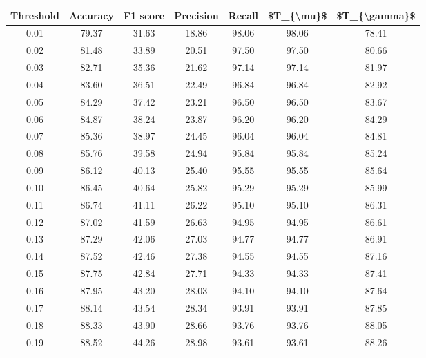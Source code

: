 \begin{tabular}{|c|c|c|c|c|c|c|}
\hline
 Threshold &  Accuracy &  F1 score &  Precision &  Recall &  \$T\_\{\textbackslash mu\}\$ &  \$T\_\{\textbackslash gamma\}\$ \\
\hline
      0.01 &     79.37 &     31.63 &      18.86 &   98.06 &      98.06 &         78.41 \\
      0.02 &     81.48 &     33.89 &      20.51 &   97.50 &      97.50 &         80.66 \\
      0.03 &     82.71 &     35.36 &      21.62 &   97.14 &      97.14 &         81.97 \\
      0.04 &     83.60 &     36.51 &      22.49 &   96.84 &      96.84 &         82.92 \\
      0.05 &     84.29 &     37.42 &      23.21 &   96.50 &      96.50 &         83.67 \\
      0.06 &     84.87 &     38.24 &      23.87 &   96.20 &      96.20 &         84.29 \\
      0.07 &     85.36 &     38.97 &      24.45 &   96.04 &      96.04 &         84.81 \\
      0.08 &     85.76 &     39.58 &      24.94 &   95.84 &      95.84 &         85.24 \\
      0.09 &     86.12 &     40.13 &      25.40 &   95.55 &      95.55 &         85.64 \\
      0.10 &     86.45 &     40.64 &      25.82 &   95.29 &      95.29 &         85.99 \\
      0.11 &     86.74 &     41.11 &      26.22 &   95.10 &      95.10 &         86.31 \\
      0.12 &     87.02 &     41.59 &      26.63 &   94.95 &      94.95 &         86.61 \\
      0.13 &     87.29 &     42.06 &      27.03 &   94.77 &      94.77 &         86.91 \\
      0.14 &     87.52 &     42.46 &      27.38 &   94.55 &      94.55 &         87.16 \\
      0.15 &     87.75 &     42.84 &      27.71 &   94.33 &      94.33 &         87.41 \\
      0.16 &     87.95 &     43.20 &      28.03 &   94.10 &      94.10 &         87.64 \\
      0.17 &     88.14 &     43.54 &      28.34 &   93.91 &      93.91 &         87.85 \\
      0.18 &     88.33 &     43.90 &      28.66 &   93.76 &      93.76 &         88.05 \\
      0.19 &     88.52 &     44.26 &      28.98 &   93.61 &      93.61 &         88.26 \\

\end{tabular}
